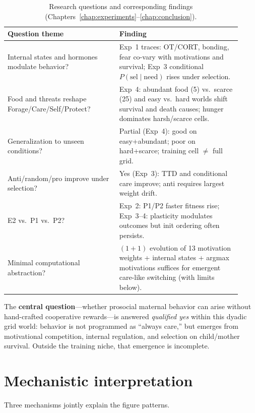 \begin{table}[H]
  \centering
  \caption{Research questions and corresponding findings (Chapters~\ref{chap:experiments}--\ref{chap:conclusion}).}
  \label{tab:rq_answers}
  \small
  \begin{tabular}{p{0.44\linewidth}p{0.48\linewidth}}
    \toprule
    \textbf{Question theme} & \textbf{Finding} \\
    \midrule
    Internal states and hormones modulate behavior? &
    Exp~1 traces: OT/CORT, bonding, fear co-vary with motivations and survival; Exp~3 conditional $P(\text{sel}\mid\text{need})$ rises under selection. \\
    Food and threats reshape Forage/Care/Self/Protect? &
    Exp~4: abundant food (5) vs.\ scarce (25) and easy vs.\ hard worlds shift survival and death causes; hunger dominates harsh/scarce cells. \\
    Generalization to unseen conditions? &
    Partial (Exp~4): good on easy+abundant; poor on hard+scarce; training cell $\neq$ full grid. \\
    Anti/random/pro improve under selection? &
    Yes (Exp~3): TTD and conditional care improve; anti requires largest weight drift. \\
    E2 vs.\ P1 vs.\ P2? &
    Exp~2: P1/P2 faster fitness rise; Exp~3--4: plasticity modulates outcomes but init ordering often persists. \\
    Minimal computational abstraction? &
    $(1{+}1)$ evolution of 13 motivation weights + internal states + argmax motivations suffices for emergent care-like switching (with limits below). \\
    \bottomrule
  \end{tabular}
\end{table}

The \textbf{central question}---whether prosocial maternal behavior can arise without hand-crafted cooperative rewards---is answered \emph{qualified yes} within this dyadic grid world: behavior is not programmed as ``always care,'' but emerges from motivational competition, internal regulation, and selection on child/mother survival.
Outside the training niche, that emergence is incomplete.

\section{Mechanistic interpretation}

Three mechanisms jointly explain the figure patterns.


